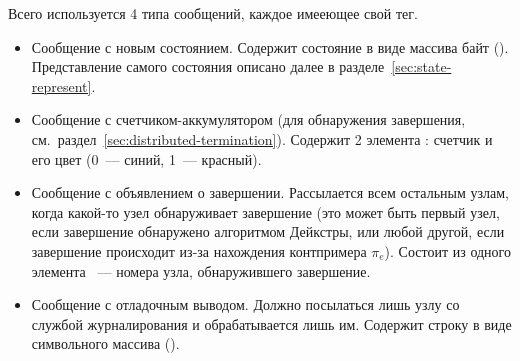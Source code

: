 Всего используется 4 типа сообщений, каждое имееющее свой тег.
\begin{itemize}
\item Сообщение с новым состоянием. Содержит состояние в виде массива байт
  (). Представление самого состояния описано далее в
  разделе~\ref{sec:state-represent}.
\item Сообщение с счетчиком-аккумулятором (для обнаружения завершения,
  см.~раздел~\ref{sec:distributed-termination}). Содержит 2 элемента :
  счетчик и его цвет (0~--- синий, 1~--- красный).
\item Сообщение с объявлением о завершении. Рассылается всем остальным узлам, когда
  какой-то узел обнаруживает завершение (это может быть первый узел, если завершение
  обнаружено алгоритмом Дейкстры, или любой другой, если завершение происходит из-за
  нахождения контпримера $\pi_e$). Состоит из одного элемента ~--- номера
  узла, обнаружившего завершение.
\item Сообщение с отладочным выводом. Должно посылаться лишь узлу со службой
  журналирования и обрабатывается лишь им. Содержит строку в виде символьного массива
  ().
\end{itemize}

